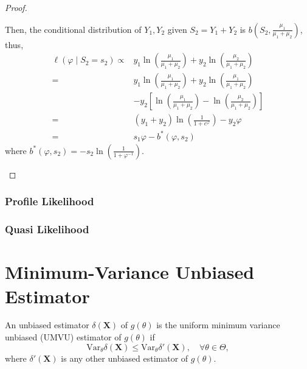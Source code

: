 \begin{proof}
\begin{enumerate}
		      Then, the conditional distribution of $Y_{1},Y_{2}$ given $S_{2}=Y_{1}+Y_{2}$ is $b\left(S_{2},\frac{\mu_{1}}{\mu_{1}+\mu_{2}}\right)$, thus,
		      \begin{equation*}
			      \begin{aligned}
				      \ell\left(\varphi\mid S_{2}=s_{2}\right)\propto & y_{1}\ln\left(\frac{\mu_{1}}{\mu_{1}+\mu_{2}}\right)+y_{2}\ln\left(\frac{\mu_{2}}{\mu_{1}+\mu_{2}}\right)          \\
				      =                                               & y_{1}\ln\left(\frac{\mu_{1}}{\mu_{1}+\mu_{2}}\right)+y_{2}\ln\left(\frac{\mu_{1}}{\mu_{1}+\mu_{2}}\right)          \\
				                                                      & -y_{2}\left[\ln\left(\frac{\mu_{1}}{\mu_{1}+\mu_{2}}\right)-\ln\left(\frac{\mu_{2}}{\mu_{1}+\mu_{2}}\right)\right] \\
				      =                                               & \left(y_{1}+y_{2}\right)\ln\left(\frac{1}{1+e^{\varphi}}\right)-y_{2}\varphi                                       \\
				      =                                               & s_{1}\varphi-b^{*}\left(\varphi,s_{2}\right)
			      \end{aligned}
		      \end{equation*}
		      where $b^{*}\left(\varphi,s_{2}\right)=-s_{2}\ln\left(\frac{1}{1+\varphi^{-1}}\right)$.
	\end{enumerate}
\end{proof}

\subsubsection{Profile Likelihood}

\subsubsection{Quasi Likelihood}

\section{Minimum-Variance Unbiased Estimator}

\begin{definition}
	An unbiased estimator $\delta(\textbf{X})$ of $g(\theta)$ is the uniform minimum variance unbiased (UMVU) estimator of $g(\theta)$ if
	\begin{equation}
		\text{Var}_{\theta}\delta(\textbf{X})\leq\text{Var}_{\theta}\delta'(\textbf{X}),\quad\forall\theta\in\Theta,
	\end{equation}
	where $\delta'(\textbf{X})$ is any other unbiased estimator of $g(\theta)$.
\end{definition}

